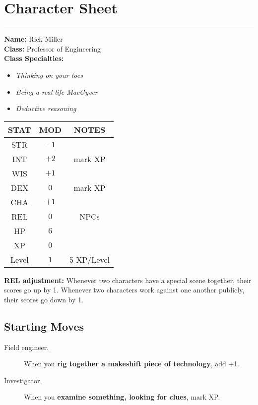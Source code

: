 \documentclass[12pt]{article}
\begin{document}
\pagebreak

\section*{Character Sheet}\label{charSheet}

\hrule

\begin{multicols}{2}
\raggedcolumns
\def\columnseprule{0.4pt}

\textbf{Name:} Rick Miller\\
\textbf{Class:} Professor of Engineering\\
\textbf{Class Specialties:}
\begin{itemize}[noitemsep]
\item \textit{Thinking on your toes}
\item \textit{Being a real-life MacGyver}
\item \textit{Deductive reasoning}
\end{itemize}

\bigskip
\begin{tabular}{|c|c|c|}\hline
\textbf{STAT} & \textbf{MOD} & \textbf{NOTES} \\\hline
STR   & $-1$ &                     \\\hline
INT   & $+2$ & mark XP             \\\hline
WIS   & $+1$ &                     \\\hline
DEX   &  $0$ & mark XP             \\\hline
CHA   & $+1$ &                     \\\hline
REL   &  $0$ & NPCs                \\\hline
HP    &  $6$ &                     \\\hline
XP    &  $0$ &                     \\\hline
Level &  $1$ & 5 XP/Level          \\\hline
\end{tabular}
\bigskip

\textbf{REL adjustment:} Whenever two characters have a special scene together, their scores go up by 1. Whenever two characters work against one another publicly, their scores go down by 1.

\columnbreak

\subsection*{Starting Moves}
\begin{description}
\item[Field engineer.] When you \textbf{rig together a makeshift piece of technology}, add +1.
\item[Investigator.] When you \textbf{examine something, looking for clues}, mark XP.
\end{description}


\end{multicols}
\end{document}
